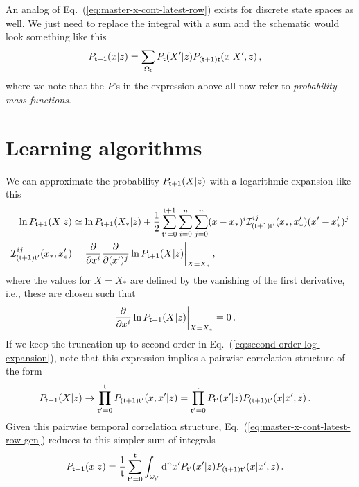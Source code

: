 An analog of Eq.~(\ref{eq:master-x-cont-latest-row}) exists for discrete state spaces as well. We just need to replace the integral with a sum and the schematic would look something like this
\begin{align}
P_{{\sf t}+1}(x\vert z) &= \sum_{\Omega_{{\sf t}}} P_{{\sf t}}(X'\vert z) P_{({\sf t}+1){\sf t}}(x \vert X', z) \label{eq:master-x-disc} \,,
\end{align}
where we note that the $P$'s in the expression above all now refer to \emph{probability mass functions}.

\section{\sffamily Learning algorithms}

We can approximate the probability $P_{{\sf t}+1}(X\vert z)$ with a logarithmic expansion like this
\begin{align}
\ln P_{{\sf t}+1}(X\vert z) &\simeq \ln P_{{\sf t}+1}(X_*\vert z) + \frac{1}{2}\sum_{{\sf t}'=0}^{{\sf t}+1}\sum_{i=0}^{n}\sum_{j=0}^{n} (x-x_*)^i {\cal I}^{ij}_{({\sf t}+1){\sf t}'}(x_*,x'_*) (x'-x'_*)^j \label{eq:second-order-log-expansion} \\
{\cal I}^{ij}_{({\sf t}+1){\sf t}'}(x_*,x'_*) &= \frac{\partial}{\partial x^i}\frac{\partial}{\partial (x')^j}\ln P_{{\sf t}+1}(X\vert z) \bigg\vert_{X=X_*} \,,
\end{align}
where the values for $X=X_*$ are defined by the vanishing of the first derivative, i.e., these are chosen such that
\begin{align}
\frac{\partial}{\partial x^i}\ln P_{{\sf t}+1}(X\vert z) \bigg\vert_{X=X_*} &= 0 \,.
\end{align}
If we keep the truncation up to second order in Eq.~(\ref{eq:second-order-log-expansion}), note that this expression implies a pairwise correlation structure of the form
\begin{align}
P_{{\sf t}+1}(X\vert z) &\rightarrow \prod_{{\sf t}'=0}^{{\sf t}}P_{({\sf t}+1){\sf t}'}(x,x'\vert z) = \prod_{{\sf t}'=0}^{{\sf t}}P_{{\sf t}'}(x'\vert z)P_{({\sf t}+1){\sf t}'}(x\vert x', z) \,.
\end{align}
Given this pairwise temporal correlation structure, Eq.~(\ref{eq:master-x-cont-latest-row-gen}) reduces to this simpler sum of integrals
\begin{align}
P_{{\sf t}+1}(x\vert z) &= \frac{1}{{\sf t}}\sum_{{\sf t}'=0}^{{\sf t}}\int_{\omega_{{\sf t}'}}{\rm d}^nx' P_{{\sf t}'}(x'\vert z)P_{({\sf t}+1){\sf t}'}(x\vert x',z) \label{eq:second-order-correl} \,.
\end{align}


